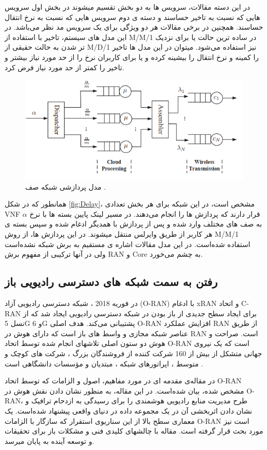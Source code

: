 در این دسته مقالات، سرویس ها به دو بخش تقسیم میشوند در بخش اول سرویس هایی که  نسبت به تاخیر حساسند و دسته ی دوم سرویس هایی که نسبت به نرخ انتقال حساسند. همچنین در برخی مقالات هر دو ویژگی برای یک سرویس مد نظر می‌باشد.
در این مدل های سیستم، تاخیر با استفاده از M/M/1 در ساده ترین حالت یا برای نزدیک تر شدن به حالت حقیقی از M/D/1 نیز استفاده می‌شود. میتوان در این مدل ها تاخیر را کمینه و نرخ انتقال را بیشینه کرده و یا 
برای کاربران نرخ را از حد مورد نیاز بیشتر و تاخیر را کمتر از حد مورد نیاز فرض کرد\cite{frdl,luong2018novel,luong2018novel1,guo2016exploiting}.
 \begin{figure}%
  \centering
    \includegraphics[scale = 0.7]{./fig/Delay}
  \caption{مدل پردازشی شبکه صف \cite{frdl}.}
  \label{fig:Delay}
\end{figure}
همانطور که در شکل \eqref{fig:Delay}، مشخص است، در این شبکه برای هر بخش تعدادی VNF قرار دارند که پردازش ها را انجام می‌دهند. در مسیر لینک پایین
بسته ها با نرخ $\alpha$ به صف های مختلف وارد شده و پس از پردازش با همدیگر ادغام شده و سپس بسته ی هر کاربر از طریق وایرلس منتقل میشوند.
در این پردازش ها، از روش M/M/1 استفاده شده‌است.
در این مدل مقالات اشاره ی مستقیم به برش شبکه نشده‌است ولی
در آنها ترکیبی از مفهوم برش RAN و Core به چشم می‌خورد.
\subsection{رفتن به سمت شبکه های دسترسی رادیویی باز}
در فوریه 2018 ، شبکه دسترسی رادیویی آزاد (O-RAN) با ادغام  xRAN و اتحاد C-RAN برای ایجاد سطح جدیدی از باز بودن در شبکه دسترسی رادیویی ایجاد شد که از نسل 5G و 6G پشتیبانی می‌کند.
هدف اصلی O-RAN افزایش عملکرد RAN از طریق عناصر شبکه مجازی و واسط های باز است که دارای هوش در RAN است.
صراحت و هوش دو ستون اصلی تلاشهای انجام شده توسط اتحاد O-RAN است که یک نیروی جهانی متشکل از بیش از 160 شرکت کننده از فروشندگان بزرگ ، شرکت های کوچک و متوسط ، اپراتورهای شبکه ، مبتدیان و مؤسسات دانشگاهی است
\cite{oranpaper}
.

در مقاله‌ی 
\cite{oranInt}
 مقدمه ای در مورد مفاهیم، اصول و الزامات  که توسط اتحاد O-RAN مشخص شده، بیان شده‌است.
 در این مقاله،
 به منظور نشان دادن نقش هوش در O-RAN، طرح مدیریت منابع رادیویی هوشمندی را برای رسیدگی به ازدحام ترافیک و نشان دادن اثربخشی آن در یک مجموعه داده در دنیای واقعی پیشنهاد شده‌است.
 یک معماری سطح بالا از این سناریوی استقرار که سازگار با الزامات O-RAN است نیز مورد بحث قرار گرفته است. مقاله با چالشهای کلیدی فنی و مشکلات باز برای تحقیقات و توسعه آینده به پایان میرسد.
 
